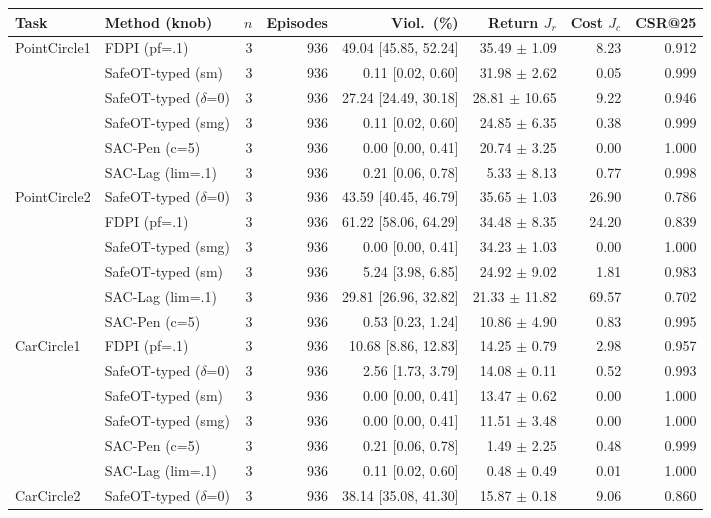 \begin{tabular}{llrrrrrr}
\toprule
Task & Method (knob) & $n$ & Episodes & Viol.\ (\%) & Return $J_r$ & Cost $J_c$ & CSR@25 \\
\midrule
PointCircle1 & FDPI (pf=.1) & 3 & 936 & 49.04 [45.85, 52.24] & 35.49 $\pm$ 1.09 & 8.23 & 0.912 \\
 & SafeOT-typed (sm) & 3 & 936 & 0.11 [0.02, 0.60] & 31.98 $\pm$ 2.62 & 0.05 & 0.999 \\
 & SafeOT-typed ($\delta$=0) & 3 & 936 & 27.24 [24.49, 30.18] & 28.81 $\pm$ 10.65 & 9.22 & 0.946 \\
 & SafeOT-typed (smg) & 3 & 936 & 0.11 [0.02, 0.60] & 24.85 $\pm$ 6.35 & 0.38 & 0.999 \\
 & SAC-Pen (c=5) & 3 & 936 & 0.00 [0.00, 0.41] & 20.74 $\pm$ 3.25 & 0.00 & 1.000 \\
 & SAC-Lag (lim=.1) & 3 & 936 & 0.21 [0.06, 0.78] & 5.33 $\pm$ 8.13 & 0.77 & 0.998 \\
\midrule
PointCircle2 & SafeOT-typed ($\delta$=0) & 3 & 936 & 43.59 [40.45, 46.79] & 35.65 $\pm$ 1.03 & 26.90 & 0.786 \\
 & FDPI (pf=.1) & 3 & 936 & 61.22 [58.06, 64.29] & 34.48 $\pm$ 8.35 & 24.20 & 0.839 \\
 & SafeOT-typed (smg) & 3 & 936 & 0.00 [0.00, 0.41] & 34.23 $\pm$ 1.03 & 0.00 & 1.000 \\
 & SafeOT-typed (sm) & 3 & 936 & 5.24 [3.98, 6.85] & 24.92 $\pm$ 9.02 & 1.81 & 0.983 \\
 & SAC-Lag (lim=.1) & 3 & 936 & 29.81 [26.96, 32.82] & 21.33 $\pm$ 11.82 & 69.57 & 0.702 \\
 & SAC-Pen (c=5) & 3 & 936 & 0.53 [0.23, 1.24] & 10.86 $\pm$ 4.90 & 0.83 & 0.995 \\
\midrule
CarCircle1 & FDPI (pf=.1) & 3 & 936 & 10.68 [8.86, 12.83] & 14.25 $\pm$ 0.79 & 2.98 & 0.957 \\
 & SafeOT-typed ($\delta$=0) & 3 & 936 & 2.56 [1.73, 3.79] & 14.08 $\pm$ 0.11 & 0.52 & 0.993 \\
 & SafeOT-typed (sm) & 3 & 936 & 0.00 [0.00, 0.41] & 13.47 $\pm$ 0.62 & 0.00 & 1.000 \\
 & SafeOT-typed (smg) & 3 & 936 & 0.00 [0.00, 0.41] & 11.51 $\pm$ 3.48 & 0.00 & 1.000 \\
 & SAC-Pen (c=5) & 3 & 936 & 0.21 [0.06, 0.78] & 1.49 $\pm$ 2.25 & 0.48 & 0.999 \\
 & SAC-Lag (lim=.1) & 3 & 936 & 0.11 [0.02, 0.60] & 0.48 $\pm$ 0.49 & 0.01 & 1.000 \\
\midrule
CarCircle2 & SafeOT-typed ($\delta$=0) & 3 & 936 & 38.14 [35.08, 41.30] & 15.87 $\pm$ 0.18 & 9.06 & 0.860 \\

\end{tabular}
